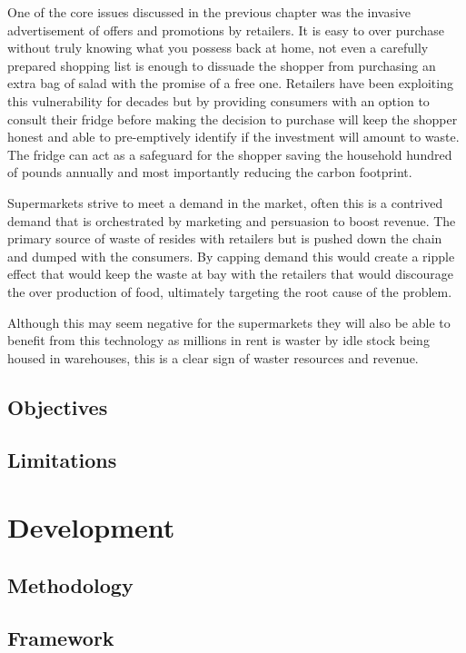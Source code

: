 \documentclass[a4paper, 11pt]{article}
\begin{document}
One of the core issues discussed in the previous chapter was the invasive advertisement of offers and promotions by retailers. It is easy to over purchase without truly knowing what you possess back at home, not even a carefully prepared shopping list is enough to dissuade the shopper from purchasing an extra bag of salad with the promise of a free one. Retailers have been exploiting this vulnerability for decades but by providing consumers with an option to consult their fridge before making the decision to purchase will keep the shopper honest and able to pre-emptively identify if the investment will amount to waste. The fridge can act as a safeguard for the shopper saving the household hundred of pounds annually and most importantly reducing the carbon footprint. 

Supermarkets strive to meet a demand in the market, often this is a contrived demand that is orchestrated by marketing and persuasion to boost revenue. The primary source of waste of resides with retailers but is pushed down the chain and dumped with the consumers. By capping demand this would create a ripple effect that would keep the waste at bay with the retailers that would discourage the over production of food, ultimately targeting the root cause of the problem.

Although this may seem negative for the supermarkets they will also be able to benefit from this technology as millions in rent is waster by idle stock being housed in warehouses, this is a clear sign of waster resources and revenue. 
\subsection{Objectives}
\subsection{Limitations}
\clearpage


\section{Development}
\subsection{Methodology}
\subsection{Framework}
\end{document}
